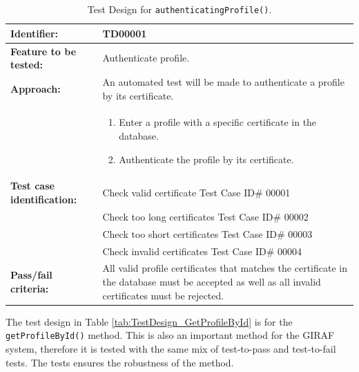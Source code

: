 \begin{table}[H]
	\centering
		\begin{tabular}{| p{4.5cm} | m{9cm} |}
			\hline
			\textbf{Identifier:} 				& TD00001 \\ \hline
			\textbf{Feature to be tested:}		& Authenticate profile. \\ \hline
			\textbf{Approach:}					& An automated test will be made to authenticate a profile by its certificate. \\
												&	\begin{enumerate}
														\item Enter a profile with a specific certificate in the database.
														\item Authenticate the profile by its certificate.
													\end{enumerate} \\ \hline
			\textbf{Test case identification:} 	& Check valid certificate Test Case ID\# 00001 \\
												& Check too long certificates Test Case ID\# 00002 \\
												& Check too short certificates Test Case ID\# 00003 \\
												& Check invalid certificates Test Case ID\# 00004 \\ \hline
			\textbf{Pass/fail criteria:}			& All valid profile certificates that matches the certificate in the database must be accepted as well as all invalid certificates must be rejected. \\ \hline
		\end{tabular}
	\caption{Test Design for \texttt{authenticatingProfile()}.}
	\label{tab:TestDesign_AuthenticateProfile}
\end{table}

The test design in Table \vref{tab:TestDesign_GetProfileById} is for the \texttt{getProfileById()} method.
This is also an important method for the GIRAF system, therefore it is tested with the same mix of test-to-pass and test-to-fail tests.
The tests ensures the robustness of the method.

